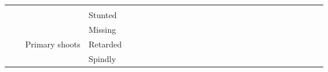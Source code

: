 \documentclass[12pt]{article}\usepackage[]{graphicx}\usepackage[]{color}
\begin{document}
\begin{table}[h]
{{\begin{minipage}{\textwidth}
\begin{tabular}{llllllllllllllllllllllllllll}
  \multicolumn{1}{l|}{} &
  \multicolumn{1}{l|}{} &
  \multicolumn{1}{l|}{} &
  \multicolumn{1}{l|}{} &
  \multicolumn{1}{l|}{} &
  \multicolumn{1}{l|}{} &
  \multicolumn{1}{l|}{} &
  \multicolumn{1}{l|}{} &
  \multicolumn{1}{l|}{} &
  \multicolumn{1}{l|}{} &
  \multicolumn{1}{l|}{} &
   &
   &
   &
   &
   &
   &
   &
   &
   &
   &
   \\ \cline{4-17}
\multicolumn{1}{|l|}{} &
  \multicolumn{1}{l|}{} &
  \multicolumn{1}{l|}{} &
  \multicolumn{1}{l|}{Stunted} &
  \multicolumn{1}{l|}{} &
  \multicolumn{1}{l|}{} &
  \multicolumn{1}{l|}{} &
  \multicolumn{1}{l|}{} &
  \multicolumn{1}{l|}{} &
  \multicolumn{1}{l|}{} &
  \multicolumn{1}{l|}{} &
  \multicolumn{1}{l|}{} &
  \multicolumn{1}{l|}{} &
  \multicolumn{1}{l|}{} &
  \multicolumn{1}{l|}{} &
  \multicolumn{1}{l|}{} &
  \multicolumn{1}{l|}{} &
   &
   &
   &
   &
   &
   &
   &
   &
   &
   &
   \\ \cline{4-17}
\multicolumn{1}{|l|}{} &
  \multicolumn{1}{l|}{} &
  \multicolumn{1}{l|}{} &
  \multicolumn{1}{l|}{Missing} &
  \multicolumn{1}{l|}{} &
  \multicolumn{1}{l|}{} &
  \multicolumn{1}{l|}{} &
  \multicolumn{1}{l|}{} &
  \multicolumn{1}{l|}{} &
  \multicolumn{1}{l|}{} &
  \multicolumn{1}{l|}{} &
  \multicolumn{1}{l|}{} &
  \multicolumn{1}{l|}{} &
  \multicolumn{1}{l|}{} &
  \multicolumn{1}{l|}{} &
  \multicolumn{1}{l|}{} &
  \multicolumn{1}{l|}{} &
   &
   &
   &
   &
   &
   &
   &
   &
   &
   &
   \\ \cline{3-17}
\multicolumn{1}{|l|}{} &
  \multicolumn{1}{l|}{} &
  \multicolumn{1}{l|}{Primary shoots} &
  \multicolumn{1}{l|}{Retarded} &
  \multicolumn{1}{l|}{} &
  \multicolumn{1}{l|}{} &
  \multicolumn{1}{l|}{} &
  \multicolumn{1}{l|}{} &
  \multicolumn{1}{l|}{} &
  \multicolumn{1}{l|}{} &
  \multicolumn{1}{l|}{} &
  \multicolumn{1}{l|}{} &
  \multicolumn{1}{l|}{} &
  \multicolumn{1}{l|}{} &
  \multicolumn{1}{l|}{} &
  \multicolumn{1}{l|}{} &
  \multicolumn{1}{l|}{} &
   &
   &
   &
   &
   &
   &
   &
   &
   &
   &
   \\ \cline{3-17}
\multicolumn{1}{|l|}{} &
  \multicolumn{1}{l|}{} &
  \multicolumn{1}{l|}{} &
  \multicolumn{1}{l|}{Spindly} &
  \multicolumn{1}{l|}{} &
  \multicolumn{1}{l|}{} &
  \multicolumn{1}{l|}{} &
  \multicolumn{1}{l|}{} &
  \multicolumn{1}{l|}{} &
  \multicolumn{1}{l|}{} &
  \multicolumn{1}{l|}{} &
  \multicolumn{1}{l|}{} &
  \multicolumn{1}{l|}{} &
  \multicolumn{1}{l|}{} &
  \multicolumn{1}{l|}{} &
  \multicolumn{1}{l|}{} &
  \multicolumn{1}{l|}{} &
   &
   &
   &
   &
   &
   &
   &
   &
   &
   &
   \\ \cline{2-17}

\end{tabular}
\end{minipage}}}
\end{table}
\end{document}
